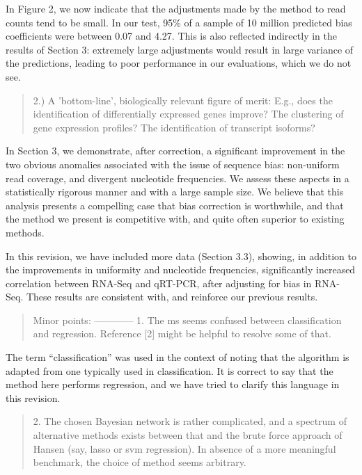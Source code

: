 \documentclass{article}
\begin{document}
In Figure 2, we now indicate that the adjustments made by the method to read
counts tend to be small. In our test, 95\% of a sample of 10 million predicted
bias coefficients were between 0.07 and 4.27. This is also reflected indirectly
in the results of Section 3: extremely large adjustments would result in large
variance of the predictions, leading to poor performance in our evaluations,
which we do not see.


\begin{quote}
2.) A 'bottom-line', biologically relevant figure of merit: E.g., does
the identification of differentially expressed genes improve? The
clustering of gene expression profiles? The identification of
transcript isoforms?
\end{quote}

In Section 3, we demonstrate, after correction, a significant improvement in
the two obvious anomalies associated with the issue of sequence bias:
non-uniform read coverage, and divergent nucleotide frequencies. We assess these
aspects in a statistically rigorous manner and with a large sample size. We
believe that this analysis presents a compelling case that bias correction is
worthwhile, and that the method we present is competitive with, and quite often
superior to existing methods.

In this revision, we have included more data (Section 3.3), showing, in addition
to the improvements in uniformity and nucleotide frequencies, significantly
increased correlation between RNA-Seq and qRT-PCR, after adjusting for bias in
RNA-Seq.  These results are consistent with, and reinforce our previous results.


\begin{quote}
Minor points:
------------
1. The ms seems confused between classification and regression.
Reference [2] might be helpful to resolve some of that.
\end{quote}

The term ``classification'' was used in the context of noting that the algorithm
is adapted from one typically used in classification. It is correct to say that
the method here performs regression, and we have tried to clarify this language
in this revision.



\begin{quote}
2. The chosen Bayesian network is rather complicated, and a spectrum
of alternative methods exists between that and the brute force
approach of Hansen (say, lasso or svm regression). In absence of a
more meaningful benchmark, the choice of method seems arbitrary.
\end{quote}
\end{document}
